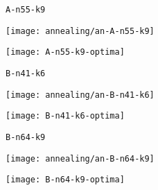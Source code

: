 \begin{figure}[H]
	\begin{minipage}{0.15\textwidth}
		\centering
		\texttt{A-n55-k9}
	\end{minipage}%
	\begin{minipage}{0.40\textwidth}
		\centering
		\texttt{[image: annealing/an-A-n55-k9]}\par
	\end{minipage}%
	\hspace{0.03\textwidth}
	\begin{minipage}{0.40\textwidth}
		\centering
		\texttt{[image: A-n55-k9-optima]}\par
	\end{minipage}%
\end{figure}

\begin{figure}[H]
	\begin{minipage}{0.15\textwidth}
		\centering
		\texttt{B-n41-k6}
	\end{minipage}%
	\begin{minipage}{0.40\textwidth}
		\centering
		\texttt{[image: annealing/an-B-n41-k6]}\par
	\end{minipage}%
	\hspace{0.03\textwidth}
	\begin{minipage}{0.40\textwidth}
		\centering
		\texttt{[image: B-n41-k6-optima]}\par
	\end{minipage}%
\end{figure}

\begin{figure}[H]
	\begin{minipage}{0.15\textwidth}
		\centering
		\texttt{B-n64-k9}
	\end{minipage}%
	\begin{minipage}{0.40\textwidth}
		\centering
		\texttt{[image: annealing/an-B-n64-k9]}\par
	\end{minipage}%
	\hspace{0.03\textwidth}
	\begin{minipage}{0.40\textwidth}
		\centering
		\texttt{[image: B-n64-k9-optima]}\par
	\end{minipage}%
\end{figure}

